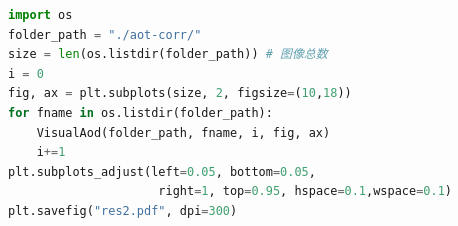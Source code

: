 \documentclass{ctexart}
\begin{document}
\begin{sloppypar}
\begin{appendices}
\begin{lstlisting}[frame=single, language=Python, basicstyle={\ttfamily}, label=aod-distribute, caption={研究区域各年度AOD分布}]
import os
folder_path = "./aot-corr/"
size = len(os.listdir(folder_path)) # 图像总数
i = 0
fig, ax = plt.subplots(size, 2, figsize=(10,18))
for fname in os.listdir(folder_path):
    VisualAod(folder_path, fname, i, fig, ax)
    i+=1
plt.subplots_adjust(left=0.05, bottom=0.05,
                     right=1, top=0.95, hspace=0.1,wspace=0.1)
plt.savefig("res2.pdf", dpi=300)
\end{lstlisting}
\end{appendices}
\end{sloppypar}
\end{document}
